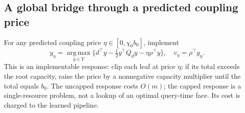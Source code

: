 \documentclass[11pt,letterpaper]{article}
\theoremstyle{definition}
\newcommand{\1}{\mathbf 1}
\newcommand{\argmax}{\operatorname*{arg\,max}}
\begin{document}
\subsection{A global bridge through a predicted coupling price}
For any predicted coupling price $\eta\in[0,\chi_0b_0]$, implement
\begin{equation}\label{eq:r14-response}
 y_\eta=\argmax_{y\in Y}\{d^\top y-\tfrac12 y^\top Q_dy-\eta\rho^\top y\},
 \quad v_\eta=\rho^\top y_\eta.
\end{equation}
This is an implementable response: clip each leaf at price $\eta$; if its total exceeds the root capacity, raise the price by a nonnegative capacity multiplier until the total equals $b_0$. The uncapped response costs $O(m)$; the capped response is a single-resource problem, not a lookup of an optimal query-time face. Its cost is charged to the learned pipeline.
\end{document}
